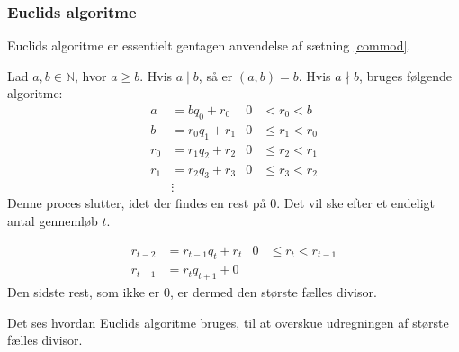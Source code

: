     \subsubsection{Euclids algoritme}
    Euclids algoritme er essentielt gentagen anvendelse af sætning \ref{commod}.
    \begin{definition}
        Lad \(a, b \in \mathbb{N}\), hvor \(a \geq b\).
        Hvis \(a \mid b\), så er \((a, b) = b\).
        Hvis \(a \nmid b\), bruges følgende algoritme:
        \begin{align*}
            a   &= b q_0    + r_0   & 0 &<    r_0 < b\\
            b   &= r_0 q_1  + r_1   & 0 &\leq r_1 < r_0\\
            r_0 &= r_1 q_2  + r_2   & 0 &\leq r_2 < r_1\\
            r_1 &= r_2 q_3  + r_3   & 0 &\leq r_3 < r_2\\
            &\vdots
        \end{align*}
        Denne proces slutter, idet der findes en rest på 0.
        Det vil ske efter et endeligt antal gennemløb \(t\).

        \begin{align*}
            r_{t-2} &= r_{t-1}  q_t      + r_t   & 0 &\leq r_t < r_{t-1}\\
            r_{t-1} &= r_t      q_{t+1}  + 0
        \end{align*}
        Den sidste rest, som ikke er 0, er dermed den største fælles divisor.\cite[11]{absalg}
    \end{definition}

    Det ses hvordan Euclids algoritme bruges, til at overskue udregningen af største fælles divisor.

